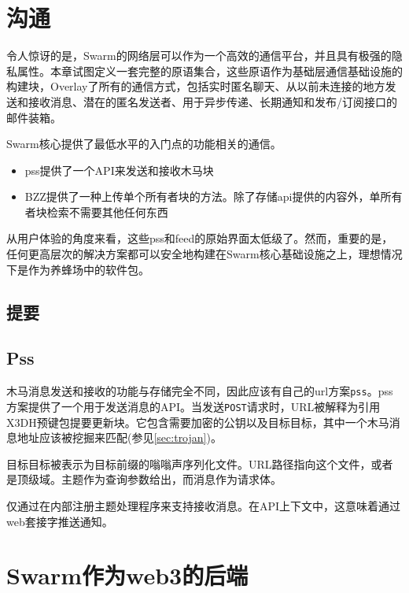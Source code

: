 \section{沟通\statusred}\label{sec:messaging}


令人惊讶的是，Swarm的网络层可以作为一个高效的通信平台，并且具有极强的隐私属性。本章试图定义一套完整的原语集合，这些原语作为基础层通信基础设施的构建块，Overlay了所有的通信方式，包括实时匿名聊天、从以前未连接的地方发送和接收消息、潜在的匿名发送者、用于异步传递、长期通知和发布/订阅接口的邮件装箱。

Swarm核心提供了最低水平的入门点的功能相关的通信。

\begin{itemize}
    \item pss提供了一个API来发送和接收木马块
    \item BZZ提供了一种上传单个所有者块的方法。除了存储api提供的内容外，单所有者块检索不需要其他任何东西
\end{itemize}



从用户体验的角度来看，这些pss和feed的原始界面太低级了。然而，重要的是，任何更高层次的解决方案都可以安全地构建在Swarm核心基础设施之上，理想情况下是作为养蜂场中的软件包。

\subsection{提要\statusorange}\label{sec:feeds-ux}


\subsection{Pss \statusorange}\label{sec:pss-ux}

木马消息发送和接收的功能与存储完全不同，因此应该有自己的url方案\lstinline{pss}。pss方案提供了一个用于发送消息的API。当发送\lstinline{POST}请求时，URL被解释为引用X3DH预键包提要更新块。它包含需要加密的公钥以及目标目标，其中一个木马消息地址应该被挖掘来匹配(参见\ref{sec:trojan})。

目标目标被表示为目标前缀的嗡嗡声序列化文件。URL路径指向这个文件，或者是顶级域。主题作为查询参数给出，而消息作为请求体。

仅通过在内部注册主题处理程序来支持接收消息。在API上下文中，这意味着通过web套接字推送通知。



\section{Swarm作为web3的后端 \statusred}\label{sec:buzz-apiary}

